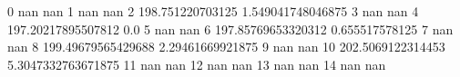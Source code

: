 0 nan nan
1 nan nan
2 198.751220703125 1.549041748046875
3 nan nan
4 197.20217895507812 0.0
5 nan nan
6 197.85769653320312 0.655517578125
7 nan nan
8 199.49679565429688 2.29461669921875
9 nan nan
10 202.5069122314453 5.3047332763671875
11 nan nan
12 nan nan
13 nan nan
14 nan nan
